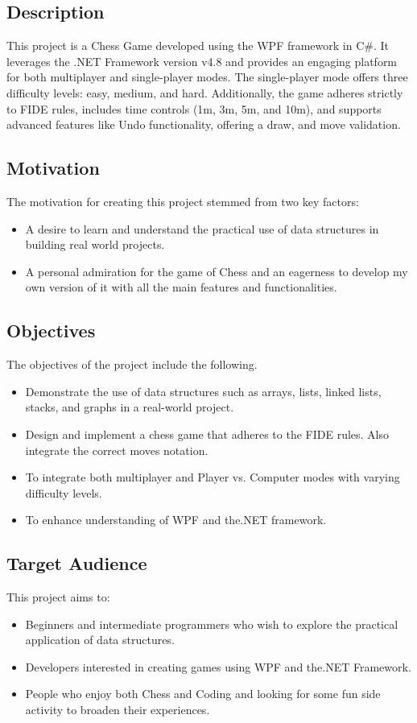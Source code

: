 \documentclass[a4paper,12pt]{article}
\begin{document}
\subsection{Description}
This project is a Chess Game developed using the WPF framework in C\#. It leverages the .NET Framework version v4.8 and provides an engaging platform for both multiplayer and single-player modes. The single-player mode offers three difficulty levels: easy, medium, and hard. Additionally, the game adheres strictly to FIDE rules, includes time controls (1m, 3m, 5m, and 10m), and supports advanced features like Undo functionality, offering a draw, and move validation. 

\subsection{Motivation}
The motivation for creating this project stemmed from two key factors:
\begin{itemize}
    \item A desire to learn and understand the practical use of data structures in building real world projects.
    \item A personal admiration for the game of Chess and an eagerness to develop my own version of it with all the main features and functionalities.
\end{itemize}

\subsection{Objectives}
The objectives of the project include the following.
\begin{itemize}
    \item Demonstrate the use of data structures such as arrays, lists, linked lists, stacks, and graphs in a real-world project.
    \item Design and implement a chess game that adheres to the FIDE rules. Also integrate the correct moves notation.
    \item To integrate both multiplayer and Player vs. Computer modes with varying difficulty levels.
    \item To enhance understanding of WPF and the.NET framework.
\end{itemize}

\subsection{Target Audience}
This project aims to:
\begin{itemize}
    \item Beginners and intermediate programmers who wish to explore the practical application of data structures.
    \item Developers interested in creating games using WPF and the.NET Framework.
    \item People who enjoy both Chess and Coding and looking for some fun side activity to broaden their experiences.
\end{itemize}
\end{document}
